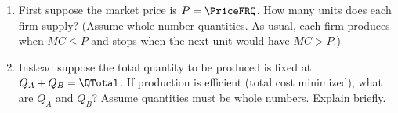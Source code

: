 \begin{questions}
{        \begin{enumerate}[label=\alph*), itemsep=0.35em, topsep=0.2em]
            \item First suppose the market price is \( P=\PriceFRQ \). How many units does each firm supply?
                  (Assume whole-number quantities. As usual, each firm produces when \(MC \le P\) and stops when the next unit would have \(MC>P\).)
            \item Instead suppose the total quantity to be produced is fixed at \( Q_A + Q_B = \QTotal \).
                  If production is efficient (total cost minimized), what are \( Q_A \) and \( Q_B \)?
                  Assume quantities must be whole numbers. Explain briefly.
        \end{enumerate}
    }

\end{questions}
